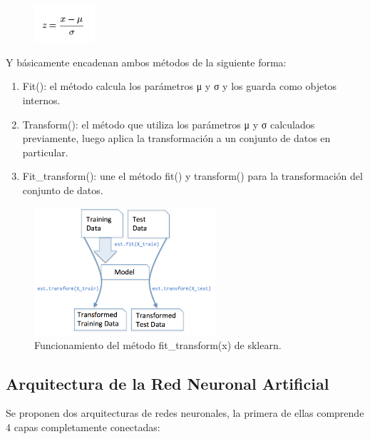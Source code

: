 \documentclass[runningheads]{llncs}
\begin{document}
\begin{figure}
	\begin{center}
		\includegraphics[width=0.2\textwidth]{images/for1.png}
	\end{center}
\end{figure}

Y b{\'a}sicamente encadenan ambos m{\'e}todos de la siguiente forma:

\begin{enumerate}
	\item Fit(): el m{\'e}todo calcula los par{\'a}metros μ y σ y los guarda como objetos internos.
	\item Transform(): el m{\'e}todo que utiliza los par{\'a}metros μ y σ calculados previamente, luego aplica la transformaci{\'o}n a un conjunto de datos en particular.
	\item Fit\_transform(): une el m{\'e}todo fit() y transform() para la transformaci{\'o}n del conjunto de datos.
\end{enumerate}

\begin{figure}
	\begin{center}
		\includegraphics[width=0.6\textwidth]{images/funcionamiento.png}
		\caption{Funcionamiento del m{\'e}todo fit\_transform(x) de sklearn.} \label{matrix}
	\end{center}
\end{figure}

\subsection{Arquitectura de la Red Neuronal Artificial}

Se proponen dos arquitecturas de redes neuronales, la primera de ellas comprende 4 capas completamente conectadas:
\end{document}
